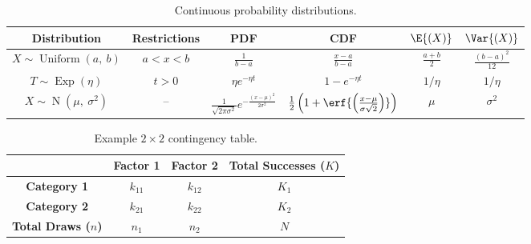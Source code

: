 \documentclass{article}
\begin{document}
\begin{table}[H]
    \centering
    \begin{tabular}{c c c c c c}
        \toprule
        \textbf{Distribution}                                       & \textbf{Restrictions} & \textbf{PDF}                                                                         & \textbf{CDF}                                                                            & \(\E{\left( X \right)}\) & \(\Var{\left( X \right)}\)            \\
        \midrule
        \(X \sim \operatorname{Uniform}{\left( a,\: b \right)}\)    & \(a < x < b\)         & \(\frac{1}{b - a}\)                                                                  & \(\frac{x - a}{b - a}\)                                                                 & \(\frac{a + b}{2}\)      & \(\frac{\left( b - a \right)^2}{12}\) \\
        \(T \sim \operatorname{Exp}{\left( \eta \right)}\)          & \(t > 0\)             & \(\eta e^{-\eta t}\)                                                                 & \(1 - e^{-\eta t}\)                                                                     & \(1/\eta\)               & \(1/\eta\)                            \\
        \(X \sim \operatorname{N}{\left( \mu,\: \sigma^2 \right)}\) & --                    & \(\frac{1}{\sqrt{2 \pi \sigma^2}} e^{-\frac{\left( x - \mu \right)^2}{2 \sigma^2}}\) & \(\frac{1}{2} \left( 1 + \erf{\left( \frac{x - \mu}{\sigma \sqrt{2}} \right)} \right)\) & \(\mu\)                  & \(\sigma^2\)                          \\
        \bottomrule
    \end{tabular}
    \caption{Continuous probability distributions.} %
\end{table}
\begin{table}[H]
    \centering
    \begin{tabular}{c c c c}
        \toprule
                                     & \textbf{Factor 1} & \textbf{Factor 2} & \textbf{Total Successes (\(K\))} \\
        \midrule
        \textbf{Category 1}          & \(k_{11}\)        & \(k_{12}\)        & \(K_1\)                          \\
        \textbf{Category 2}          & \(k_{21}\)        & \(k_{22}\)        & \(K_2\)                          \\
        \textbf{Total Draws (\(n\))} & \(n_1\)           & \(n_2\)           & \(N\)                            \\
        \bottomrule
    \end{tabular}
    \caption{Example \(2 \times 2\) contingency table.} %
\end{table}
\end{document}
